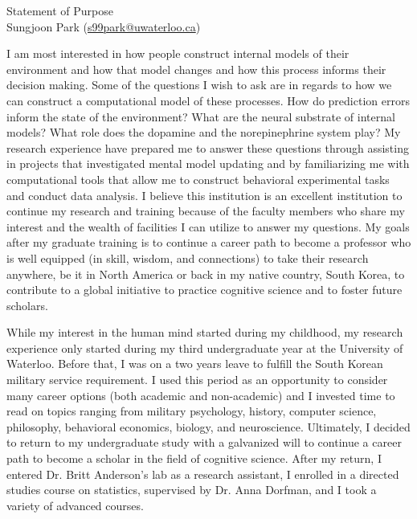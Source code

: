 \documentclass[12pt]{article}
\let\oldcenter\center
\let\oldendcenter\endcenter
\renewenvironment{center}{\setlength\topsep{-1pt}\oldcenter}{\oldendcenter}
\begin{document}
	
	\begin{center}
		{\Large Statement of Purpose} \\
		{\normalsize Sungjoon Park (\href{mailto:s99park@uwaterloo.ca}{s99park@uwaterloo.ca})}
	\end{center}
	
	I am most interested in how people construct internal models of their environment and how that model changes and how this process informs their decision making. Some of the questions I wish to ask are in regards to how we can construct a computational model of these processes. How do prediction errors inform the state of the environment? What are the neural substrate of internal models? What role does the dopamine and the norepinephrine system play? My research experience have prepared me to answer these questions through assisting in projects that investigated mental model updating and by familiarizing me with computational tools that allow me to construct behavioral experimental tasks and conduct data analysis. I believe this institution is an excellent institution to continue my research and training because of the faculty members who share my interest and the wealth of facilities I can utilize to answer my questions. My goals after my graduate training is to continue a career path to become a professor who is well equipped (in skill, wisdom, and connections) to take their research anywhere, be it in North America or back in my native country, South Korea, to contribute to a global initiative to practice cognitive science and to foster future scholars.
	
	While my interest in the human mind started during my childhood, my research experience only started during my third undergraduate year at the University of Waterloo. Before that, I was on a two years leave to fulfill the South Korean military service requirement. I used this period as an opportunity to consider many career options (both academic and non-academic) and I invested time to read on topics ranging from military psychology, history, computer science, philosophy, behavioral economics, biology, and neuroscience. Ultimately, I decided to return to my undergraduate study with a galvanized will to continue a career path to become a scholar in the field of cognitive science. After my return, I entered Dr. Britt Anderson’s lab as a research assistant, I enrolled in a directed studies course on statistics, supervised by Dr. Anna Dorfman, and I took a variety of advanced courses.
	
\end{document}
